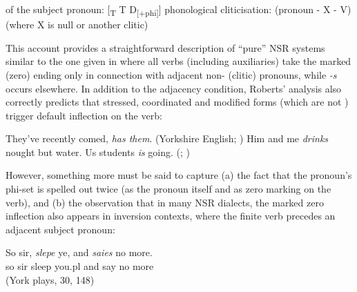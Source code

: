 \documentclass[output=paper]{langsci/langscibook}
\begin{document}
\ea\label{ex:10:26}
\ea {} of the subject pronoun: [\textsubscript{T} T D\textsubscript{[$+$phi]}]
\ex phonological cliticisation: (pronoun - X - V) (where X is null or another clitic)
\z
\z

This account provides a straightforward description of ``pure''
\gls{NSR} systems similar to the one given in
 where all verbs (including auxiliaries) take the
marked (zero) ending only in connection with adjacent non-\Tsg{} (clitic)
pronouns, while \emph{-s} occurs elsewhere. In addition
to the adjacency condition, Roberts' analysis also correctly predicts that
stressed, coordinated and modified forms (which are not ) trigger
default inflection on the verb:

\ea
\ea They've recently comed, \textit{has them}.
(Yorkshire English; \citealt[88]{Pietsch:2005b})
\ex Him and me \textit{drinks} nought but water.
\parencite[6]{Roberts:2010}
\ex Us students \textit{is} going.
(; \citealt[24]{Henry:1995})
\z
\z

However, something more must be said to capture (a) the fact that the pronoun's
phi-set is spelled out twice (as the pronoun itself and as zero marking on the
verb), and (b) the observation that in many \gls{NSR}
dialects, the marked zero inflection also appears in inversion contexts, where
the finite verb precedes an adjacent subject pronoun:

\ea \label{ex:10:28}
\gll So sir, \textit{slepe} ye, and \textit{saies} no more.\\
so sir sleep you.pl and say no more\\
\glt (York plays, 30, 148)
\z
\end{document}
